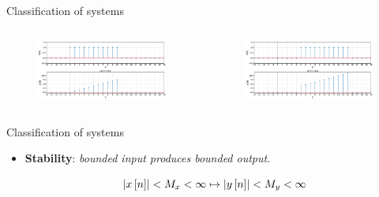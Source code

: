 \documentclass[aspectratio=169]{beamer}
\let\olditem\item
\renewcommand{\item}{\setlength{\itemsep}{\fill}\olditem}
\def\ls{\ensuremath\left[}
\def\rs{\ensuremath\right]}
\begin{document}
\begin{frame}[t]{Classification of systems}

\begin{columns}[t]
  \begin{column}{.45\linewidth}
  \begin{figure}
  \includegraphics[width=\textwidth]{img/timevar1.eps}
  \end{figure}
  \end{column}

  \begin{column}{.45\linewidth}
  \begin{figure}
  \includegraphics[width=\textwidth]{img/timevar2.eps}
  \end{figure}
  \end{column}
\end{columns}
\end{frame}


\begin{frame}[t]{Classification of systems}

\begin{itemize}
\item \textbf{Stability}: \textit{bounded input produces bounded output}.

\[ \left|x\ls n \rs\right| < M_x < \infty \mapsto \left|y\ls n \rs\right| < M_y < \infty \]
\end{itemize}
\end{frame}
\end{document}
